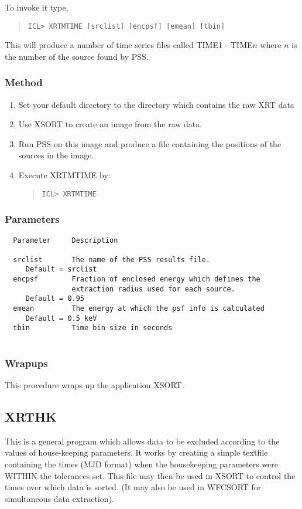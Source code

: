 \documentclass{book}
\renewcommand{\_}{{\tt\char'137}}     %
\begin{document}
To invoke it type,
\begin{quote}\begin{verbatim}
ICL> XRTMTIME [srclist] [encpsf] [emean] [tbin]
\end{verbatim}\end{quote}
This will produce a number of time series files called TIME1 -
TIME$n$ where $n$ is the number of the source found by
PSS.
 
\subsubsection{Method}
 
\begin{enumerate}
\item Set your default directory to the directory which contains
the raw XRT data
\item Use XSORT to create an image from the raw data.
\item Run PSS on this image and produce a file containing the positions
of the sources in the image.
\item Execute XRTMTIME by:
\begin{quote}\begin{verbatim}
ICL> XRTMTIME
\end{verbatim}\end{quote}
\end{enumerate}
\subsubsection{Parameters}
\begin{verbatim}
  Parameter     Description
 
  srclist       The name of the PSS results file.
     Default = srclist
  encpsf        Fraction of enclosed energy which defines the
                extraction radius used for each source.
     Default = 0.95
  emean         The energy at which the psf info is calculated
     Default = 0.5 keV
  tbin          Time bin size in seconds
 
\end{verbatim}\subsubsection{Wrapups}
This procedure wraps up the application XSORT.
 
\subsection{XRTHK}
This is a general program which allows data to be excluded
according to the values of house-keeping parameters. It works
by creating a simple textfile containing the times (MJD format) when
the housekeeping parameters were WITHIN the tolerances set.
This file may then be used in XSORT to control the times
over which data is sorted. (It may also be used in WFCSORT
for simultaneous data extraction).
 
\end{document}
